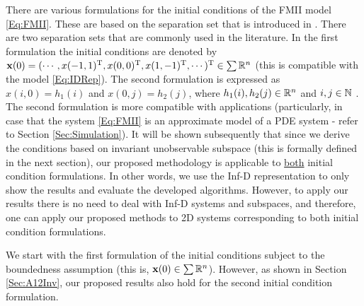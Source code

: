 \documentclass[journal,12pt,draftcls,onecolumn]{IEEEtran}
\newcommand{\tran}{\mathrm{T}}
\newcommand{\myhl}[1]{{#1}}
\begin{document}
There are various formulations for the initial conditions  of the FMII model \eqref{Eq:FMII}. These are based on the separation set that is introduced in \cite{FM_SeparationSet}. There are two separation sets that are commonly used in the literature.  In the first formulation
the initial conditions are denoted by ${\bf x}(0)=(\cdots,x(-1,1)^\tran,x(0,0)^\tran,x(1,-1)^\tran,\cdots)^\tran\in\sum\fld{R}^n$ \cite{FMinBook} (this is compatible with the model \eqref{Eq:IDRep}). The second formulation is expressed as $x(i,0)=h_1(i)$ and $x(0,j)=h_2(j)$, where $h_1(i),h_2(j)\in \mathbb{R}^n$ and $i,j\in\mathbb{N}$ \cite{Kaczorek_Book}.
The second formulation is more compatible with applications (particularly, in case that the system \eqref{Eq:FMII} is an approximate model of a PDE system - refer to Section \ref{Sec:Simulation}). It will be shown subsequently that  since we derive the conditions based on invariant unobservable subspace (this is formally defined in the next section), our proposed methodology is applicable to \underline{both} initial condition formulations. In other words, we use the Inf-D  representation  to only show the results and evaluate the developed algorithms. However, to apply our results there is no need to deal with Inf-D systems and subspaces, and therefore, one can apply our proposed methods to 2D systems corresponding to both initial condition formulations. 

\myhl{We start with the first formulation of the initial} conditions subject to the boundedness assumption (this is, ${\bf x}(0)\in\sum\mathbb{R}^n$). However, as shown in Section \ref{Sec:A12Inv}, our proposed results also hold for  the second initial condition formulation.
\end{document}
